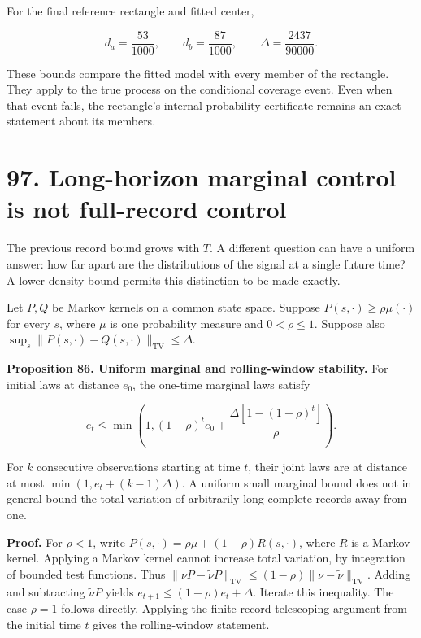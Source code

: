 \documentclass[11pt,letterpaper]{article}
\begin{document}
For the final reference rectangle and fitted center,

\[
d_a=\frac{53}{1000},\qquad d_b=\frac{87}{1000},
\qquad
\boxed{\Delta=\frac{2437}{90000}.}
\]

These bounds compare the fitted model with every member of the
rectangle. They apply to the true process on the conditional coverage
event. Even when that event fails, the rectangle's internal probability
certificate remains an exact statement about its members.

\section{97. Long-horizon marginal control is not full-record
control}\label{long-horizon-marginal-control-is-not-full-record-control}

The previous record bound grows with \(T\). A different question can
have a uniform answer: how far apart are the distributions of the signal
at a single future time? A lower density bound permits this distinction
to be made exactly.

Let \(P,Q\) be Markov kernels on a common state space. Suppose
\(P(s,\cdot)\geq\rho\mu(\cdot)\) for every \(s\), where \(\mu\) is one
probability measure and \(0<\rho\leq1\). Suppose also
\(\sup_s\|P(s,\cdot)-Q(s,\cdot)\|_{\mathrm{TV}}\leq\Delta\).

\textbf{Proposition 86. Uniform marginal and rolling-window stability.}
For initial laws at distance \(e_0\), the one-time marginal laws satisfy

\[
\boxed{
e_t\leq\min\left(1,
(1-\rho)^te_0+
\frac{\Delta[1-(1-\rho)^t]}{\rho}\right).
}
\]

For \(k\) consecutive observations starting at time \(t\), their joint
laws are at distance at most \(\min(1,e_t+(k-1)\Delta)\). A uniform
small marginal bound does not in general bound the total variation of
arbitrarily long complete records away from one.

\textbf{Proof.} For \(\rho<1\), write
\(P(s,\cdot)=\rho\mu+(1-\rho)R(s,\cdot)\), where \(R\) is a Markov
kernel. Applying a Markov kernel cannot increase total variation, by
integration of bounded test functions. Thus
\(\|\nu P-\widetilde\nu P\|_{\mathrm{TV}}\leq(1-\rho)\|\nu-\widetilde\nu\|_{\mathrm{TV}}\).
Adding and subtracting \(\widetilde\nu P\) yields
\(e_{t+1}\leq(1-\rho)e_t+\Delta\). Iterate this inequality. The case
\(\rho=1\) follows directly. Applying the finite-record telescoping
argument from the initial time \(t\) gives the rolling-window statement.
\end{document}
